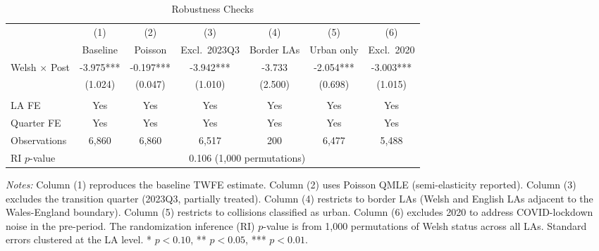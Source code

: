 \begin{table}[H]
\centering
\caption{Robustness Checks}
\label{tab:robustness}
\begin{threeparttable}
\begin{adjustbox}{max width=\textwidth}
\begin{tabular}{l cccccc}
\toprule
& (1) & (2) & (3) & (4) & (5) & (6) \\
& Baseline & Poisson & Excl.\ 2023Q3 & Border LAs & Urban only & Excl.\ 2020 \\
\midrule
Welsh $\times$ Post & -3.975*** & -0.197*** & -3.942*** & -3.733 & -2.054*** & -3.003*** \\
& (1.024) & (0.047) & (1.010) & (2.500) & (0.698) & (1.015) \\
\\
LA FE & Yes & Yes & Yes & Yes & Yes & Yes \\
Quarter FE & Yes & Yes & Yes & Yes & Yes & Yes \\
Observations & 6,860 & 6,860 & 6,517 & 200 & 6,477 & 5,488 \\
RI $p$-value & \multicolumn{6}{c}{0.106 (1,000 permutations)} \\
\bottomrule
\end{tabular}
\end{adjustbox}
\end{threeparttable}
\par\vspace{0.3em}
{\footnotesize\sloppy \textit{Notes:} Column (1) reproduces the baseline TWFE estimate. Column (2) uses Poisson QMLE (semi-elasticity reported). Column (3) excludes the transition quarter (2023Q3, partially treated). Column (4) restricts to border LAs (Welsh and English LAs adjacent to the Wales-England boundary). Column (5) restricts to collisions classified as urban. Column (6) excludes 2020 to address COVID-lockdown noise in the pre-period. The randomization inference (RI) $p$-value is from 1,000 permutations of Welsh status across all LAs. Standard errors clustered at the LA level. * $p<0.10$, ** $p<0.05$, *** $p<0.01$.}
\end{table}
